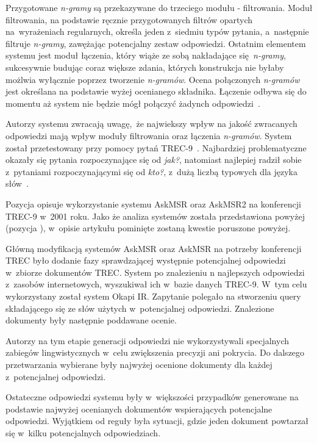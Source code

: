 Przygotowane \emph{n-gramy} są przekazywane do trzeciego modułu - filtrowania. Moduł filtrowania, na podstawie ręcznie przygotowanych filtrów opartych na~wyrażeniach regularnych, określa jeden z~siedmiu typów pytania, a~następnie filtruje \emph{n-gramy}, zawężając potencjalny zestaw odpowiedzi. Ostatnim elementem systemu jest moduł łączenia, który wiąże ze sobą nakładające się \emph{n-gramy}, sukcesywnie budując coraz większe zdania, których konstrukcja nie byłaby możlwia wyłącznie poprzez tworzenie \emph{n-gramów}. Ocena połączonych \emph{n-gramów} jest określana na podstawie wyżej ocenianego składnika. Łączenie odbywa się do momentu aż system nie będzie mógł połączyć żadynch odpowiedzi~\cite{brill2002analysis}.

Autorzy systemu zwracają uwagę, że najwiekszy wpływ na jakość zwracanych odpowiedzi mają wpływ moduły filtrowania oraz łączenia \emph{n-gramów}. System został przetestowany przy pomocy pytań TREC-9~\cite{voorhees2001trec}. Najbardziej problematyczne okazały się pytania rozpoczynające się od \emph{jak?}, natomiast najlepiej radził sobie z~pytaniami rozpoczynającymi się od \emph{kto?}, z~dużą liczbą typowych dla języka słów~\cite{brill2002analysis}.

Pozycja \cite{brill2001data} opisuje wykorzystanie systemu AskMSR oraz AskMSR2 na konferencji TREC-9 w~2001 roku. Jako że analiza systemów została przedstawiona powyżej (pozycja \cite{brill2002analysis}), w~opisie artykułu pominięte zostaną kwestie poruszone powyżej.

Główną modyfikacją systemów AskMSR oraz AskMSR na potrzeby konferencji TREC było dodanie fazy sprawdzającej występnie potencjalnej odpowiedzi w~zbiorze dokumentów TREC. System po znalezieniu n najlepszych odpowiedzi z~zasobów internetowych, wyszukiwał ich w~bazie danych TREC-9. W~tym celu wykorzystany został system Okapi IR. Zapytanie polegało na stworzeniu query składającego się ze słów użytych w~potencjalnej odpowiedzi. Znalezione dokumenty były następnie poddawane ocenie.

Autorzy \cite{brill2001data} na tym etapie generacji odpowiedzi nie wykorzystywali specjalnych zabiegów lingwistycznych w~celu zwiększenia precyzji ani pokrycia. Do dalszego przetwarzania wybierane były najwyżej ocenione dokumenty dla każdej z~potencjalnej odpowiedzi.

Ostateczne odpowiedzi systemu były w~większości przypadków generowane na podstawie najwyżej ocenianych dokumentów wspierających potencjalne odpowiedzi. Wyjątkiem od reguły była sytuacji, gdzie jeden dokument powtarzał się w~kilku potencjalnych odpowiedziach.

